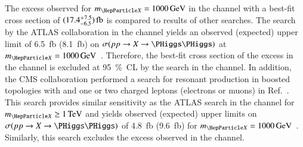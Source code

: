 The excess observed for $\mX = \SI{1000}{\GeV}$ in the \bbtautau channel with a
best-fit cross section of
$(17.4^{\hspace{0.25pt}+\hspace{0.25pt}7.5}_{-6.5})\valuesep\si{\femto\barn}$ is
compared to results of other searches. The search by the ATLAS collaboration in
the \bbbb channel yields an observed (expected) upper limit of
\SI{6.5}{\femto\barn} (\SI{8.1}{\femto\barn}) on $\sigma(\pp \to X \to \HH)$ at
$\mX = \SI{1000}{\GeV}$~\cite{HDBS-2018-41,hepdata.111124}. Therefore, the
best-fit cross section of the excess in the \bbtautau channel is excluded at
\SI{95}{\percent}~CL by the search in the \bbbb channel. In addition, the CMS
collaboration performed a search for resonant \HH production in boosted
topologies with \bbbar and one or two charged leptons (electrons or muons) in
Ref.~\cite{CMS-B2G-20-007}. This search provides similar sensitivity as the
ATLAS search in the \bbbb channel for $\mX \geq \SI{1}{\TeV}$ and yields
observed (expected) upper limits on $\sigma(\pp \to X \to \HH)$ of
\SI{4.8}{\femto\barn} (\SI{9.6}{\femto\barn}) for
$\mX = \SI{1000}{\GeV}$~\cite{CMS-B2G-20-007,hepdata.115024}. Similarly, this
search excludes the excess observed in the \bbtautau channel.




